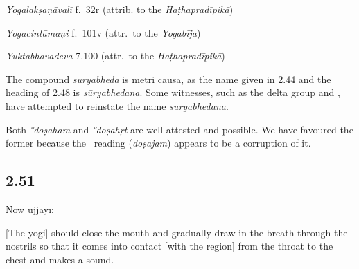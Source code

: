 \begin{ekdosis}
\begin{testimonia}[hp02_050]
\emph{Yogalakṣaṇāvalī} f.~32r (attrib. to the \emph{Haṭhapradīpikā})
\begin{versinnote}
\end{versinnote}

\emph{Yogacintāmaṇi} f.~101v (attr.~to the \emph{Yogabīja})
\begin{versinnote} 
\end{versinnote} 

\emph{Yuktabhavadeva} 7.100 (attr.~to the \emph{Haṭhapradīpikā})

\begin{versinnote}
\end{versinnote}

\end{testimonia}

\begin{philcomm}[hp02_050]
The compound \emph{sūryabheda} is metri causa, as the name given in 2.44 and the heading of 2.48 is \emph{sūryabhedana}. Some witnesses, such as the delta group and , have attempted to reinstate the name \emph{sūryabhedana}.

Both \emph{°doṣaham} and \emph{°doṣahṛt} are well attested and possible. We have favoured the former because the \textalpha\ reading (\emph{doṣajam}) appears to be a corruption of it.
\end{philcomm}

\subsection*{2.51}
\begin{translation}[hp02_051]
Now ujjāyī:

[The yogi] should close the mouth and gradually draw in the breath through the nostrils so that it comes into contact [with the region] from the throat to the chest and makes a sound.\end{translation}


\end{ekdosis}
